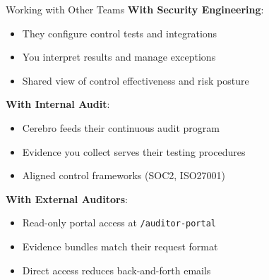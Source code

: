 \documentclass[aspectratio=169]{beamer}
\begin{document}
\begin{frame}{Working with Other Teams}
  \textbf{With Security Engineering}:
  \begin{itemize}
    \item They configure control tests and integrations
    \item You interpret results and manage exceptions
    \item Shared view of control effectiveness and risk posture
  \end{itemize}
  
  \vspace{0.3cm}
  
  \textbf{With Internal Audit}:
  \begin{itemize}
    \item Cerebro feeds their continuous audit program
    \item Evidence you collect serves their testing procedures
    \item Aligned control frameworks (SOC2, ISO27001)
  \end{itemize}
  
  \vspace{0.3cm}
  
  \textbf{With External Auditors}:
  \begin{itemize}
    \item Read-only portal access at \texttt{/auditor-portal}
    \item Evidence bundles match their request format
    \item Direct access reduces back-and-forth emails
  \end{itemize}
\end{frame}
\end{document}

